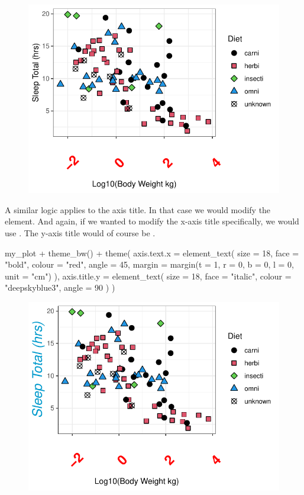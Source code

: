\vspace{2em}

\begin{figure}[H]
\includegraphics[scale = .75]{graphics/ch2Figs/ggEx_34.pdf}
\end{figure}

A similar logic applies to the axis title.  In that case we would modify the  element. And again, if we wanted to modify the x-axis title specifically, we would use .  The y-axis title would of course be .

\begin{inR}
my_plot + theme_bw() +
  theme(
    axis.text.x = element_text(
      size = 18, face = "bold", colour = "red", angle = 45,
      margin = margin(t = 1, r = 0, b = 0, l = 0, unit = "cm")
    ),
    axis.title.y = element_text(
      size = 18, face = "italic", colour = "deepskyblue3", angle = 90
    )
  )
\end{inR}

\vspace{2em}

\begin{figure}[H]
\includegraphics[scale = .75]{graphics/ch2Figs/ggEx_35.pdf}
\end{figure}

